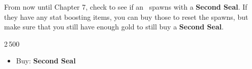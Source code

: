 From now until Chapter 7, check to see if an \anna\ spawns with a \textbf{Second Seal}. If they have any stat boosting items, you can buy those to reset the spawns, but make sure that you still have enough gold to still buy a \textbf{Second Seal}.

\begin{shop}{2\,500}
\begin{itemize}
	\robinf
	\begin{itemize}
		\item Buy: \textbf{Second Seal}
	\end{itemize}
\end{itemize}
\end{shop}